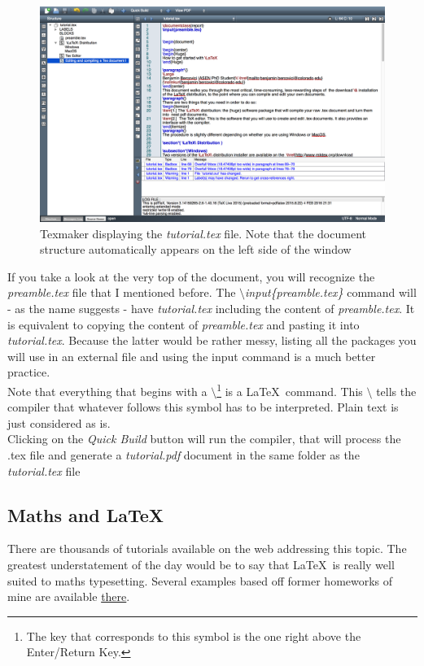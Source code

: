 \documentclass{report}
\begin{document}
\begin{figure}[H]
\centering
\includegraphics[scale=0.38]{opened_document}
\caption{Texmaker displaying the \textit{tutorial.tex} file. Note that the document structure automatically appears on the left side of the window}
\label{fig:opened_document}
\end{figure}
If you take a look at the very top of the document, you will recognize the \textit{preamble.tex} file that I mentioned before. The \textit{$\setminus$input\{preamble.tex\}} command will - as the name suggests - have \textit{tutorial.tex} including the content of \textit{preamble.tex}. It is equivalent to copying the content of \textit{preamble.tex} and pasting it into \textit{tutorial.tex}. Because the latter would be rather messy, listing all the packages you will use in an external file and using the input command is a much better practice.\\

Note that everything that begins with a $\setminus$\footnote{The key that corresponds to this symbol is the one right above the Enter/Return Key.} is a \LaTeX\ command. This $\setminus$ tells the compiler that whatever follows this symbol has to be interpreted. Plain text is just considered as is. \\
Clicking on the \textit{Quick Build} button will run the compiler, that will process the .tex file and generate a \textit{tutorial.pdf} document in the same folder as the \textit{tutorial.tex} file

\subsection*{Maths and \LaTeX }
There are thousands of tutorials available on the web addressing this topic. The greatest understatement of the day would be to say that \LaTeX\ is really well suited to maths typesetting. Several examples based off former homeworks of mine are available \href{https://drive.google.com/file/d/0Bzf79yzZcPJJSnJKOFdrLVhtSG8/view?usp=sharing}{there}.
\end{document}
